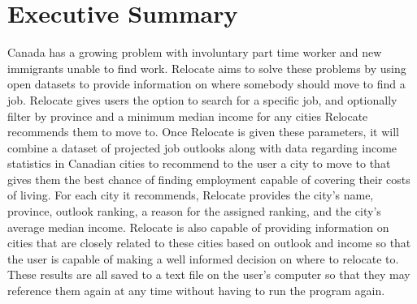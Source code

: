\documentclass[12pt,fleqn]{article}
\begin{document}
\newpage
\section*{Executive Summary}
Canada has a growing problem with involuntary part time worker and new immigrants unable to find work. Relocate aims to solve these problems by using open datasets to provide information on where somebody should move to find a job. Relocate gives users the option to search for a specific job, and optionally filter by province and a minimum median income for any cities Relocate recommends them to move to. Once Relocate is given these parameters, it will combine a dataset of projected job outlooks along with data regarding income statistics in Canadian cities to recommend to the user a city to move to that gives them the best chance of finding employment capable of covering their costs of living. For each city it recommends, Relocate provides the city’s name, province, outlook ranking, a reason for the assigned ranking, and the city’s average median income. Relocate is also capable of providing information on cities that are closely related to these cities based on outlook and income so that the user is capable of making a well informed decision on where to relocate to. These results are all saved to a text file on the user’s computer so that they may reference them again at any time without having to run the program again.



\newpage
\end{document}
